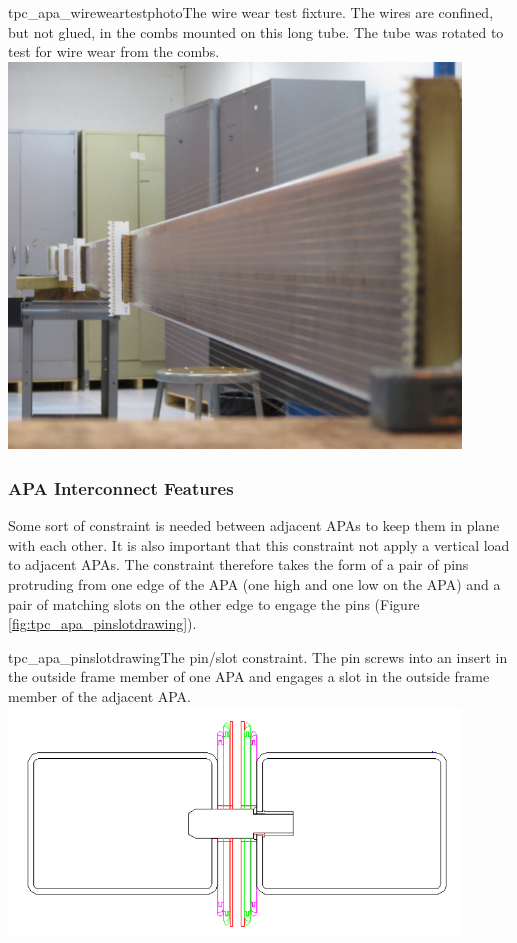 \begin{cdrfigure}{tpc_apa_wireweartestphoto}{The wire wear test fixture.  The wires are confined, but not glued, in the combs mounted on this long tube.  The tube was rotated to test for wire wear from the combs.}
\includegraphics[width=0.9\textwidth]{figures/tpc_apa_wireweartestphoto.png} 
\end{cdrfigure}


\subsubsection{APA Interconnect Features}

Some sort of constraint is needed between adjacent APAs to keep them in plane with each other.  It is also important that this constraint not apply a vertical load to adjacent APAs.  The constraint therefore takes the form of a pair of pins protruding from one edge of the APA (one high and one low on the APA) and a pair of matching slots on the other edge to engage the pins (Figure \ref{fig:tpc_apa_pinslotdrawing}).

\begin{cdrfigure}{tpc_apa_pinslotdrawing}{The pin/slot constraint.  The pin screws into an insert in the outside frame member of one APA and engages a slot in the outside frame member of the adjacent APA.}
\includegraphics[width=0.9\textwidth]{figures/tpc_apa_pinslotdrawing.png} 
\end{cdrfigure}

